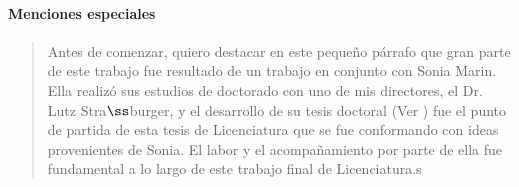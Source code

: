 \newpage
\bigskip

\paragraph{Menciones especiales}

\begin{quote}
	Antes de comenzar, quiero destacar en este pequeño párrafo que gran parte de este trabajo fue resultado de un trabajo en conjunto con Sonia Marin. Ella realizó sus estudios de doctorado con uno de mis directores, el Dr. Lutz Stra$\ss$burger, y el desarrollo de su tesis doctoral (Ver \cite{marin2018}) fue el punto de partida de esta tesis de Licenciatura que se fue conformando con ideas provenientes de Sonia. El labor y el acompañamiento por parte de ella fue fundamental a lo largo de este trabajo final de Licenciatura.s
\end{quote}


